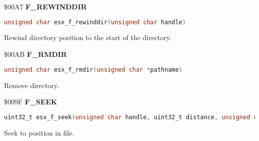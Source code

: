 \$00A7 \textbf{F\_REWINDDIR}

\begin{lstlisting}[language=C]
unsigned char esx_f_rewinddir(unsigned char handle)
\end{lstlisting}

Rewind directory position to the start of the directory.


\$00AB \textbf{F\_RMDIR}

\begin{lstlisting}[language=C]
unsigned char esx_f_rmdir(unsigned char *pathname)
\end{lstlisting}

Remove directory.


\$009F \textbf{F\_SEEK}

\begin{lstlisting}[language=C]
uint32_t esx_f_seek(unsigned char handle, uint32_t distance, unsigned char whence)
\end{lstlisting}

Seek to position in file.

%

